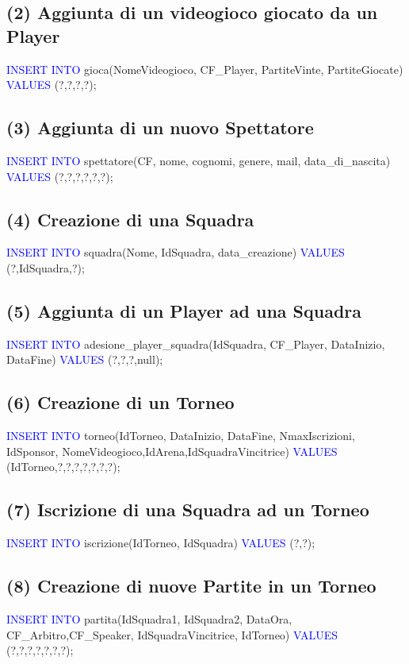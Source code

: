 \documentclass[a4paper,12pt]{report}
\begin{document}
\subsection*{(2) Aggiunta di un videogioco giocato da un Player}
\textcolor{blue}{INSERT INTO} gioca(NomeVideogioco, CF\_Player, PartiteVinte, PartiteGiocate)
\textcolor{blue}{VALUES} (?,?,?,?);

\subsection*{(3) Aggiunta di un nuovo Spettatore}
\textcolor{blue}{INSERT INTO} spettatore(CF, nome, cognomi, genere, mail, data\_di\_nascita)
\textcolor{blue}{VALUES} (?,?,?,?,?,?);

\subsection*{(4) Creazione di una Squadra}
\textcolor{blue}{INSERT INTO} squadra(Nome, IdSquadra, data\_creazione)
\textcolor{blue}{VALUES} (?,IdSquadra,?);

\subsection*{(5) Aggiunta di un Player ad una Squadra}
\textcolor{blue}{INSERT INTO} adesione\_player\_squadra(IdSquadra, CF\_Player, DataInizio, DataFine)
\textcolor{blue}{VALUES} (?,?,?,null);

\subsection*{(6) Creazione di un Torneo}
\textcolor{blue}{INSERT INTO} torneo(IdTorneo, DataInizio, DataFine, NmaxIscrizioni, IdSponsor, NomeVideogioco,IdArena,IdSquadraVincitrice)
\textcolor{blue}{VALUES} (IdTorneo,?,?,?,?,?,?,?);

\subsection*{(7) Iscrizione di una Squadra ad un Torneo}
\textcolor{blue}{INSERT INTO} iscrizione(IdTorneo, IdSquadra)
\textcolor{blue}{VALUES} (?,?);

\subsection*{(8) Creazione di nuove Partite in un Torneo}
\textcolor{blue}{INSERT INTO} partita(IdSquadra1, IdSquadra2, DataOra, CF\_Arbitro,CF\_Speaker, IdSquadraVincitrice, IdTorneo)
\textcolor{blue}{VALUES} (?,?,?,?,?,?,?);
\end{document}
